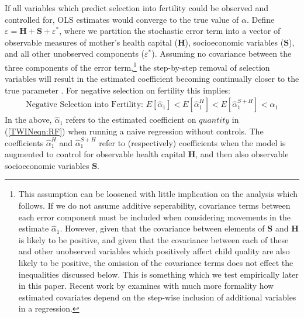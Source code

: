 \documentclass[subeqn]{article}
\begin{document}
\begin{spacing}{1.4}

If all variables which predict selection into fertility could be observed and controlled for, OLS estimates would converge to the true value
of $\alpha$.  Define $\varepsilon=\bm{H}+\bm{S}+\varepsilon^*$, where we partition the
stochastic error term into a vector of observable measures of mother's health
capital ($\bm{H}$), socioeconomic variables ($\bm{S}$), and all other unobserved components
($\varepsilon^*$).  Assuming no covariance between the three components of the
error term,\footnote{This assumption can be loosened with little implication on the
  analysis which follows.  If we do not assume additive seperability, covariance
  terms between each error component must be included when considering movements in
  the estimate $\hat\alpha_1$.  However, given that the covariance between elements
  of $\bm{S}$ and $\bm{H}$ is likely to be positive, and given that the covariance
  between each of these and other unobserved variables which positively affect
  child quality are also likely to be positive, the omission of the covariance
  terms does not effect the inequalities discussed below.  This is something which
  we test empirically later in this paper.  Recent work by \citet{Gelbach2016}
  examines with much more formality how estimated covariates depend on the step-wise
  inclusion of additional variables in a regression.} the step-by-step removal of
selection variables will result in the estimated coefficient becoming continually closer to the true parameter . For negative selection on fertility this implies:
\begin{eqnarray}
  \text{Negative Selection into Fertility:\ \ \ } E[\hat\alpha_1] < E[\hat\alpha_1^{H}] < E[\hat\alpha_1^{S+H}] < \alpha_1 \nonumber 
\end{eqnarray}
In the above, $\hat\alpha_1$ refers to the estimated coefficient on
$quantity$ in (\ref{TWINeqn:RF}) when running a naive regression without
controls.  The coefficients $\hat\alpha_1^H$ and $\hat\alpha_1^{S+H}$
refer to (respectively) coefficients when the model is augmented to
control for observable health capital $\bm{H}$, and then also observable
socioeconomic variables $\bm{S}$.


\end{spacing}
\end{document}
